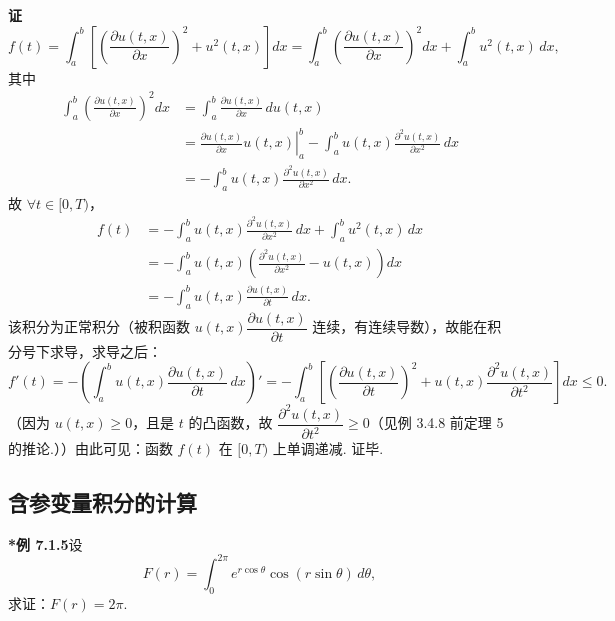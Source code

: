 \documentclass[UTF8, 12pt, fontset=fandol, oneside]{ctexart}
\begin{document}
\noindent\textbf{证}\quad
\[
f(t)=\int_a^b\left[\left(\frac{\partial u(t,x)}{\partial x}\right)^2+u^2(t,x)\right]dx
=\int_a^b\left(\frac{\partial u(t,x)}{\partial x}\right)^2dx+\int_a^b u^2(t,x)\,dx,
\]
其中
\[
\begin{aligned}
\int_a^b\left(\frac{\partial u(t,x)}{\partial x}\right)^2dx
&=\int_a^b\frac{\partial u(t,x)}{\partial x}\,du(t,x)\\
&=\left.\frac{\partial u(t,x)}{\partial x}u(t,x)\right|_a^b
-\int_a^b u(t,x)\frac{\partial^2u(t,x)}{\partial x^2}\,dx\\
&=-\int_a^b u(t,x)\frac{\partial^2u(t,x)}{\partial x^2}\,dx.
\end{aligned}
\]
故 $\forall t\in[0,T)$，
\[
\begin{aligned}
f(t)
&=-\int_a^b u(t,x)\frac{\partial^2u(t,x)}{\partial x^2}\,dx
+\int_a^b u^2(t,x)\,dx\\
&=-\int_a^b u(t,x)\left(\frac{\partial^2u(t,x)}{\partial x^2}-u(t,x)\right)dx\\
&=-\int_a^b u(t,x)\frac{\partial u(t,x)}{\partial t}\,dx.
\end{aligned}
\]
该积分为正常积分（被积函数 $u(t,x)\dfrac{\partial u(t,x)}{\partial t}$ 连续，有连续导数），故能在积分号下求导，求导之后：
\[
f'(t)=-\left(\int_a^b u(t,x)\frac{\partial u(t,x)}{\partial t}\,dx\right)'
=-\int_a^b\left[\left(\frac{\partial u(t,x)}{\partial t}\right)^2
+u(t,x)\frac{\partial^2u(t,x)}{\partial t^2}\right]dx\le0.
\]
（因为 $u(t,x)\ge0$，且是 $t$ 的凸函数，故 $\dfrac{\partial^2u(t,x)}{\partial t^2}\ge0$（见例 3.4.8 前定理 5 的推论.））由此可见：函数 $f(t)$ 在 $[0,T)$ 上单调递减. 证毕.

\subsection*{含参变量积分的计算}

\noindent\textbf{*例 7.1.5}\quad 设
\[
F(r)=\int_0^{2\pi}e^{r\cos\theta}\cos(r\sin\theta)\,d\theta,
\]
求证：$F(r)=2\pi$.
\end{document}
